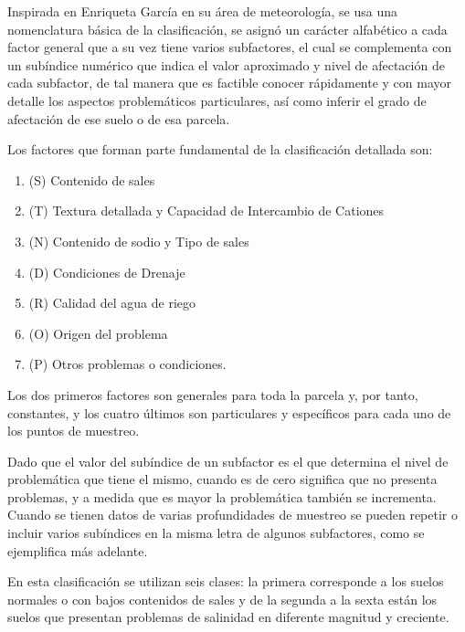 Inspirada en Enriqueta García en su área de meteorología, se usa una nomenclatura básica de la clasificación, se asignó un carácter alfabético a cada factor general que a su vez tiene varios subfactores, el cual se complementa con un subíndice numérico que indica el valor aproximado y nivel de afectación de cada subfactor, de tal manera que es factible conocer rápidamente y con mayor detalle los aspectos problemáticos particulares, así como inferir el grado de afectación de ese suelo o de esa parcela.

Los factores que forman parte fundamental de la clasificación detallada son:
\begin{enumerate}
    \item (S) Contenido de sales
    \item (T) Textura detallada y Capacidad de Intercambio de Cationes
    \item (N) Contenido de sodio y Tipo de sales
    \item (D) Condiciones de Drenaje
    \item (R) Calidad del agua de riego
    \item (O) Origen del problema
    \item (P) Otros problemas o condiciones.
\end{enumerate}
Los dos primeros factores son generales para toda la parcela y, por tanto, constantes, y los cuatro últimos son particulares y específicos para cada uno de los puntos de muestreo.

Dado que el valor del subíndice de un subfactor es el que determina el nivel de problemática que tiene el mismo, cuando es de cero significa que no presenta problemas, y a medida que es mayor la problemática también se incrementa. Cuando se tienen datos de varias profundidades de muestreo se pueden repetir o incluir varios subíndices en la misma letra de algunos subfactores, como se ejemplifica más adelante.

En esta clasificación se utilizan seis clases: la primera corresponde a los suelos normales o con bajos contenidos de sales y de la segunda a la sexta están los suelos que presentan problemas de salinidad en diferente magnitud y creciente.
